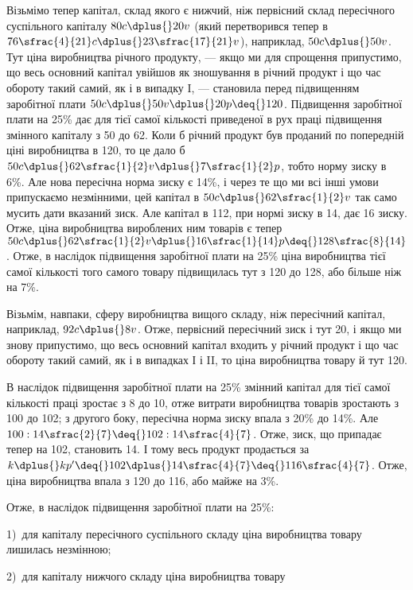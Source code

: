 
Візьмімо тепер капітал, склад якого є нижчий, ніж первісний
склад пересічного суспільного капіталу $80 c \dplus{} 20 v$ (який
перетворився тепер в $76\sfrac{4}{21}c \dplus{} 23\sfrac{17}{21}v$), наприклад, $50 c \dplus{} 50 v$.
Тут ціна виробництва річного продукту, — якщо ми для спрощення
припустимо, що весь основний капітал увійшов як зношування
в річний продукт і що час обороту такий самий, як
і в випадку I, — становила перед підвищенням заробітної плати
$50 c \dplus{} 50 v \dplus{} 20 p \deq{} 120$. Підвищення заробітної плати на 25\%
дає для тієї самої кількості приведеної в рух праці підвищення
змінного капіталу з 50 до 62. Коли б річний продукт був
проданий по попередній ціні виробництва в 120, то це дало б
$50 c \dplus{} 62\sfrac{1}{2}v \dplus{} 7\sfrac{1}{2}p$, тобто норму зиску в 6\%.
Але нова пересічна норма зиску є 14\%, і через те що ми всі інші умови
припускаємо незмінними, цей капітал в $50 c \dplus{} 62\sfrac{1}{2}v$ так само
мусить дати вказаний зиск. Але капітал в 112, при нормі зиску
в 14, дає 16 зиску.
Отже, ціна виробництва вироблених
ним товарів є тепер $50 c \dplus{} 62\sfrac{1}{2}v \dplus{} 16\sfrac{1}{14}p \deq{} 128\sfrac{8}{14}$. Отже, в наслідок
підвищення заробітної плати на 25\% ціна виробництва
тієї самої кількості того самого товару підвищилась тут з 120
до 128, або більше ніж на 7\%.

Візьмім, навпаки, сферу виробництва вищого складу, ніж пересічний
капітал, наприклад, $92 c \dplus{} 8 v$. Отже, первісний пересічний
зиск і тут \deq{} 20, і якщо ми знову припустимо, що весь
основний капітал входить у річний продукт і що час обороту
такий самий, як і в випадках І і II, то ціна виробництва товару
й тут \deq{} 120.

В наслідок підвищення заробітної плати на 25\% змінний капітал
для тієї самої кількості праці зростає з 8 до 10, отже
витрати виробництва товарів зростають з 100 до 102; з другого
боку, пересічна норма зиску впала з 20\% до 14\%. Але
$100 : 14\sfrac{2}{7} \deq{} 102 : 14\sfrac{4}{7}$.
Отже, зиск, що припадає тепер на 102,
становить 14. І тому весь продукт продається за
$k \dplus{} kp' \deq{} 102 \dplus{} 14\sfrac{4}{7} \deq{} 116\sfrac{4}{7}$. Отже, ціна виробництва впала
з 120 до 116, або майже на 3\%.

Отже, в наслідок підвищення заробітної плати на 25\%:

1)~для капіталу пересічного суспільного складу ціна виробництва
товару лишилась незмінною;

2)~для капіталу нижчого складу ціна виробництва товару
\parbreak{}  %
